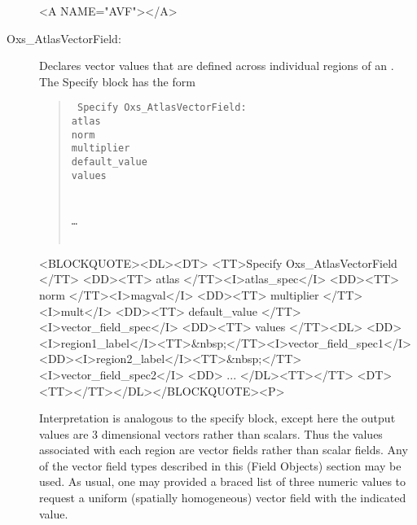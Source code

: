 \begin{description}
\begin{rawhtml}<A NAME="AVF"></A>\end{rawhtml}%
%
\item[Oxs\_AtlasVectorField:\label{item:AtlasVectorField}]
   Declares vector values that are defined across individual regions of
   an .  The Specify block has the form
      \begin{latexonly}
      \begin{quote}\tt
      Specify Oxs\_AtlasVectorField: \ocb\\
       \bi atlas \\
       \bi norm \\
       \bi multiplier \\
       \bi default\_value \\
       \bi values \ocb\\
       \bi\bi{}\\
       \bi\bi{}\\
       \bi\bi \ldots\\
       \bi\ccb\\
      \ccb
      \end{quote}
      \end{latexonly}
      \begin{rawhtml}<BLOCKQUOTE><DL><DT>
      <TT>Specify Oxs_AtlasVectorField {</TT>
      <DD><TT> atlas </TT><I>atlas_spec</I>
      <DD><TT> norm </TT><I>magval</I>
      <DD><TT> multiplier </TT><I>mult</I>
      <DD><TT> default_value </TT><I>vector_field_spec</I>
      <DD><TT> values {</TT><DL>
          <DD><I>region1_label</I><TT>&nbsp;</TT><I>vector_field_spec1</I>
          <DD><I>region2_label</I><TT>&nbsp;</TT><I>vector_field_spec2</I>
          <DD> ...
      </DL><TT>}</TT>
      <DT><TT>}</TT></DL></BLOCKQUOTE><P>
      \end{rawhtml}
   Interpretation is analogous to the
   specify block, except here the output values are 3 dimensional
   vectors rather than scalars.  Thus the values associated with each
   region are vector fields rather than scalar fields.  Any of the
   vector field types described in this (Field Objects) section may be
   used.  As usual, one may provided a braced list of three numeric
   values to request a uniform (spatially homogeneous) vector field with
   the indicated value.


\end{description}
